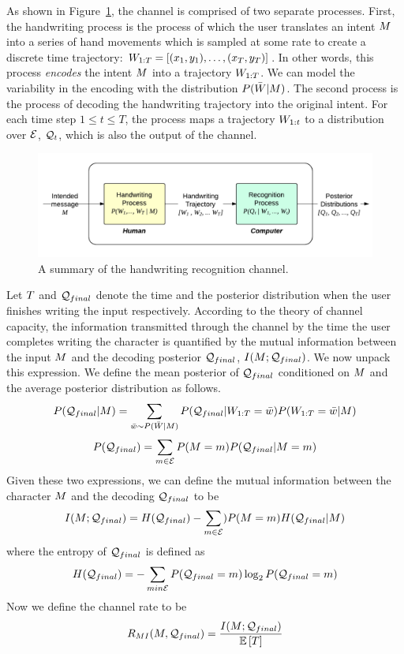 \documentclass{sigchi}
\begin{document}
As shown in Figure~\ref{fig:hwr_channel}, the channel is comprised of
two separate processes. First, the handwriting process is the process
of which the user translates an intent $M$ into a series of hand
movements which is sampled at some rate to create a discrete time
trajectory: $W_{1:{T}} = \left[ (x_1,y_1), \ldots, (x_T,y_T)
\right]$. In other words, this process {\em encodes} the intent
$M$ into a trajectory $W_{1:{T}}$. We can model the
variability in the encoding with the distribution $P(\bar{W} | M)$. The
second process is the process of decoding the handwriting trajectory
into the original intent. For each time step $1 \le t \le T$, the process
maps a trajectory $W_{1:{t}}$ to a distribution over $\mathcal{E}$,
$\mathcal{Q}_{t}$, which is also the output of the channel.

\begin{figure}
  \centering
  \includegraphics[width=0.9\columnwidth]{figures/hwr_channel.pdf}
  \caption{A summary of the handwriting recognition channel.}
  \label{fig:hwr_channel}
\end{figure}

Let $T$ and $\mathcal{Q}_{final}$ denote the time and the posterior
distribution when the user finishes writing the input respectively.
According to the theory of channel capacity, the information
transmitted through the channel by the time the user completes writing
the character is quantified by the mutual information between the
input $M$ and the decoding posterior $\mathcal{Q}_{final}$, $I(M ;
\mathcal{Q}_{final})$. We now unpack this expression.  We define the mean
posterior of $\mathcal{Q}_{final}$ conditioned on $M$ and the average
posterior distribution as follows.
\[
P(\mathcal{Q}_{final} | M)=
\sum_{\bar{w} \sim P(\bar{W} | M)} { P(\mathcal{Q}_{final} | W_{1:{T}} = \bar{w})
P(W_{1:{T}} = \bar{w} | M)} 
\]
\[
P(\mathcal{Q}_{final})
=
\sum_{m \in \mathcal{E}} 
P(M = m) P(\mathcal{Q}_{final} | M = m)
\]
Given these two expressions, we can define the mutual information
between the character $M$ and the decoding $\mathcal{Q}_{final}$ to be 
\[
I(M ; \mathcal{Q}_{final}) = H(\mathcal{Q}_{final}) - \sum_{m \in \mathcal{E}})
P(M = m) H(\mathcal{Q}_{final} | M)
\]
where the entropy of $\mathcal{Q}_{final}$ is defined as
\[
H(\mathcal{Q}_{final}) = -\sum_{m in \mathcal{E}} {
P(\mathcal{Q}_{final} = m) \log_2 P(\mathcal{Q}_{final} = m)}
\]
Now we define the channel rate to be 
\begin{align}
\label{eq:channel_rate}
R_{MI}(M, \mathcal{Q}_{final}) 
= 
\frac{I( M ;  \mathcal{Q}_{final})}{\mathbb{E} \left[T\right]}
\end{align}
\end{document}

